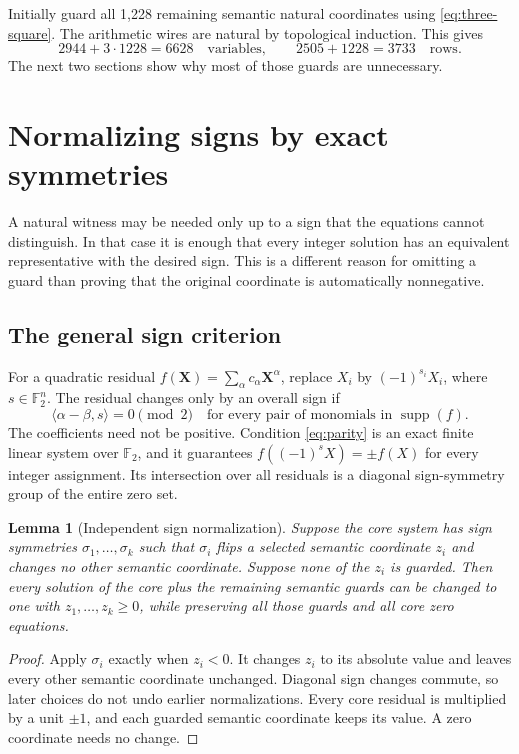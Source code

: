 \documentclass[11pt,letterpaper]{article}
\newtheorem{lemma}[theorem]{Lemma}
\theoremstyle{definition}
\newcommand{\Ftwo}{\mathbb F_2}
\newcommand{\supp}{\operatorname{supp}}
\begin{document}
Initially guard all 1,228 remaining semantic natural coordinates using
\eqref{eq:three-square}. The arithmetic wires are natural by topological
induction. This gives
\[
2944+3\cdot1228=6628\quad\text{variables},\qquad
2505+1228=3733\quad\text{rows}.
\]
The next two sections show why most of those guards are unnecessary.

\section{Normalizing signs by exact symmetries}
\label{sec:signs}

A natural witness may be needed only up to a sign that the equations
cannot distinguish. In that case it is enough that every integer
solution has an equivalent representative with the desired sign. This
is a different reason for omitting a guard than proving that the
original coordinate is automatically nonnegative.

\subsection{The general sign criterion}

For a quadratic residual
$f(\boldsymbol X)=\sum_\alpha c_\alpha\boldsymbol X^\alpha$, replace
$X_i$ by $(-1)^{s_i}X_i$, where $s\in\Ftwo^n$. The residual changes
only by an overall sign if
\begin{equation}
\label{eq:parity}
\langle \alpha-\beta,s\rangle=0\pmod2
\quad\text{for every pair of monomials in }\supp(f).
\end{equation}
The coefficients need not be positive. Condition \eqref{eq:parity} is
an exact finite linear system over $\Ftwo$, and it guarantees
$f((-1)^sX)=\pm f(X)$ for every integer assignment. Its intersection
over all residuals is a diagonal sign-symmetry group of the entire
zero set.

\begin{lemma}[Independent sign normalization]
\label{lem:normalize}
Suppose the core system has sign symmetries $\sigma_1,\ldots,\sigma_k$
such that $\sigma_i$ flips a selected semantic coordinate $z_i$ and
changes no other semantic coordinate. Suppose none of the $z_i$ is
guarded. Then every solution of the core plus the remaining semantic
guards can be changed to one with $z_1,\ldots,z_k\ge0$, while preserving
all those guards and all core zero equations.
\end{lemma}
\begin{proof}
Apply $\sigma_i$ exactly when $z_i<0$. It changes $z_i$ to its absolute
value and leaves every other semantic coordinate unchanged. Diagonal
sign changes commute, so later choices do not undo earlier
normalizations. Every core residual is multiplied by a unit $\pm1$,
and each guarded semantic coordinate keeps its value. A zero coordinate
needs no change.
\end{proof}
\end{document}
